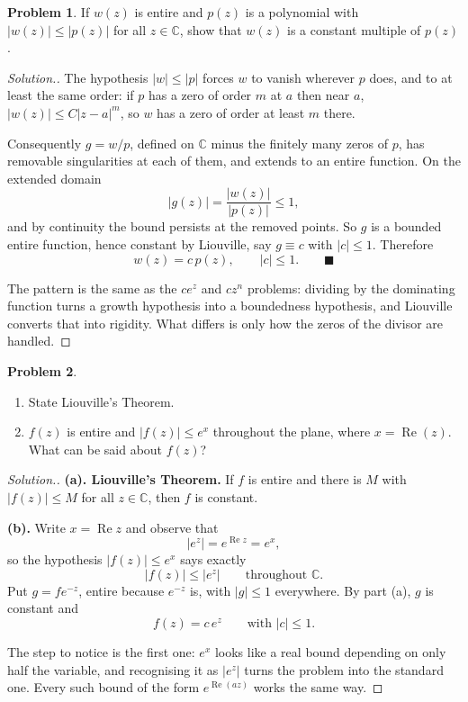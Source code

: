 \documentclass[11pt,a4paper]{article}
\theoremstyle{definition}
\newtheorem{problemx}{Problem}[section]
\newenvironment{problem}{\begin{problemx}}{\end{problemx}}
\newenvironment{solution}
  {\renewcommand{\qedsymbol}{}\begin{proof}[\textit{Solution}.]}
  {\end{proof}}
\begin{document}
\begin{problem}
If $w(z)$ is entire and $p(z)$ is a polynomial with
$\left|w(z)\right| \leq \left|p(z)\right|$ for all $z \in \mathbb{C}$, show that
$w(z)$ is a constant multiple of $p(z)$.
\end{problem}

\begin{solution}
The hypothesis $\left|w\right| \leq \left|p\right|$ forces $w$ to vanish wherever
$p$ does, and to at least the same order: if $p$ has a zero of order $m$ at $a$
then near $a$, $\left|w(z)\right| \leq C\left|z-a\right|^{m}$, so $w$ has a zero of
order at least $m$ there.

Consequently $g = w/p$, defined on $\mathbb{C}$ minus the finitely many zeros of
$p$, has removable singularities at each of them, and extends to an entire
function. On the extended domain
$$\left|g(z)\right| = \frac{\left|w(z)\right|}{\left|p(z)\right|} \leq 1 ,$$
and by continuity the bound persists at the removed points. So $g$ is a bounded
entire function, hence constant by Liouville, say $g \equiv c$ with
$\left|c\right| \leq 1$. Therefore
$$\boxed{w(z) = c\,p(z),\qquad \left|c\right| \leq 1 .} \qquad \blacksquare$$

The pattern is the same as the $ce^{z}$ and $cz^{n}$ problems: dividing by the
dominating function turns a growth hypothesis into a boundedness hypothesis, and
Liouville converts that into rigidity. What differs is only how the zeros of the
divisor are handled.
\end{solution}


\begin{problem}
\begin{enumerate}
\item[(a).] State Liouville's Theorem.
\item[(b).] $f(z)$ is entire and $\left|f(z)\right| \leq e^{x}$ throughout the
plane, where $x = \operatorname{Re}(z)$. What can be said about $f(z)$?
\end{enumerate}
\end{problem}

\begin{solution}
\textbf{(a). Liouville's Theorem.} If $f$ is entire and there is $M$ with
$\left|f(z)\right| \leq M$ for all $z \in \mathbb{C}$, then $f$ is constant.

\textbf{(b).} Write $x = \operatorname{Re}z$ and observe that
$$\left|e^{z}\right| = e^{\operatorname{Re}z} = e^{x},$$
so the hypothesis $\left|f(z)\right| \leq e^{x}$ says exactly
$$\left|f(z)\right| \leq \left|e^{z}\right| \qquad\text{throughout } \mathbb{C}.$$
Put $g = fe^{-z}$, entire because $e^{-z}$ is, with $\left|g\right| \leq 1$
everywhere. By part (a), $g$ is constant and
$$\boxed{f(z) = c\,e^{z} \qquad\text{with } \left|c\right| \leq 1 .}$$

The step to notice is the first one: $e^{x}$ looks like a real bound depending on
only half the variable, and recognising it as $\left|e^{z}\right|$ turns the problem
into the standard one. Every such bound of the form $e^{\operatorname{Re}(az)}$
works the same way.
\end{solution}
\end{document}
